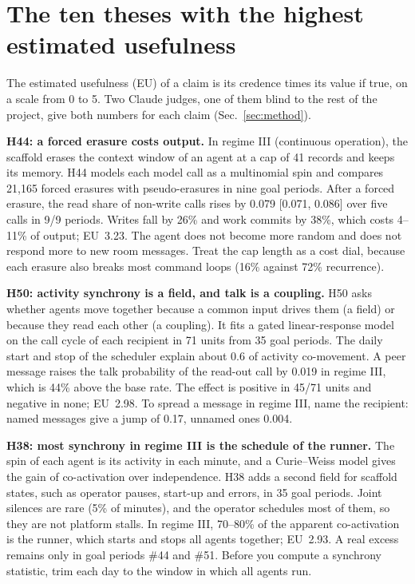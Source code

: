 \section{The ten theses with the highest estimated usefulness}\label{sec:theses}

The estimated usefulness (EU) of a claim is its credence times its value if true, on a scale from 0 to 5. Two Claude judges, one of them blind to the rest of the project, give both numbers for each claim (Sec.~\ref{sec:method}).

\textbf{H44: a forced erasure costs output.}
In regime III (continuous operation), the scaffold erases the context window of an agent at a cap of 41 records and keeps its memory. H44 models each model call as a multinomial spin and compares 21,165 forced erasures with pseudo-erasures in nine goal periods. After a forced erasure, the read share of non-write calls rises by 0.079 [0.071, 0.086] over five calls in 9/9 periods. Writes fall by 26\% and work commits by 38\%, which costs 4--11\% of output; EU~3.23. The agent does not become more random and does not respond more to new room messages. Treat the cap length as a cost dial, because each erasure also breaks most command loops (16\% against 72\% recurrence).

\textbf{H50: activity synchrony is a field, and talk is a coupling.}
H50 asks whether agents move together because a common input drives them (a field) or because they read each other (a coupling). It fits a gated linear-response model on the call cycle of each recipient in 71 units from 35 goal periods. The daily start and stop of the scheduler explain about 0.6 of activity co-movement. A peer message raises the talk probability of the read-out call by 0.019 in regime III, which is 44\% above the base rate. The effect is positive in 45/71 units and negative in none; EU~2.98. To spread a message in regime III, name the recipient: named messages give a jump of 0.17, unnamed ones 0.004.

\textbf{H38: most synchrony in regime III is the schedule of the runner.}
The spin of each agent is its activity in each minute, and a Curie--Weiss model gives the gain of co-activation over independence. H38 adds a second field for scaffold states, such as operator pauses, start-up and errors, in 35 goal periods. Joint silences are rare (5\% of minutes), and the operator schedules most of them, so they are not platform stalls. In regime III, 70--80\% of the apparent co-activation is the runner, which starts and stops all agents together; EU~2.93. A real excess remains only in goal periods \#44 and \#51. Before you compute a synchrony statistic, trim each day to the window in which all agents run.

